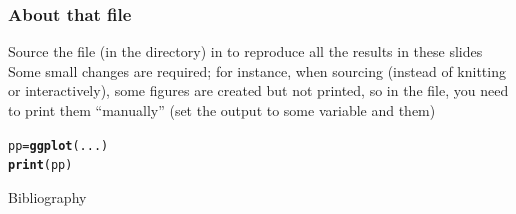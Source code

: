 \documentclass[aspectratio=169]{beamer}\usepackage[]{graphicx}\usepackage[]{xcolor}
\makeatletter
\newcommand{\hldef}[1]{\textcolor[rgb]{0.345,0.345,0.345}{#1}}%
\newcommand{\hlkwb}[1]{\textcolor[rgb]{0.69,0.353,0.396}{#1}}%
\newcommand{\hlkwd}[1]{\textcolor[rgb]{0.737,0.353,0.396}{\textbf{#1}}}%
\newenvironment{kframe}{%
 \def\at@end@of@kframe{}%
 \ifinner\ifhmode%
  \def\at@end@of@kframe{\end{minipage}}%
  \begin{minipage}{\columnwidth}%
 \fi\fi%
 \def\FrameCommand##1{\hskip\@totalleftmargin \hskip-\fboxsep
 \colorbox{shadecolor}{##1}\hskip-\fboxsep
     \hskip-\linewidth \hskip-\@totalleftmargin \hskip\columnwidth}%
 \MakeFramed {\advance\hsize-\width
   \@totalleftmargin\z@ \linewidth\hsize
   \@setminipage}}%
 {\par\unskip\endMakeFramed%
 \at@end@of@kframe}
\newenvironment{knitrout}{}{} %
\makeatother
\begin{document}
\begin{frame}[fragile]\frametitle{About that  file}
Source the file  (in the  directory) in  to reproduce all the results in these slides
\vfill
Some small changes are required; for instance, when sourcing (instead of knitting or interactively), some figures are created but not printed, so in the  file, you need to print them ``manually'' (set the output to some variable and  them)
\vfill
\begin{knitrout}
\color{fgcolor}\begin{kframe}
\begin{alltt}
\hldef{pp} \hlkwb{=} \hlkwd{ggplot}\hldef{(...)}
\hlkwd{print}\hldef{(pp)}
\end{alltt}
\end{kframe}
\end{knitrout}
\end{frame}


\begin{frame}[allowframebreaks]{Bibliography}


\end{frame}
\end{document}
